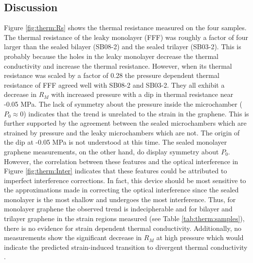 \subsection{Discussion}
Figure \ref{fig:therm:Rs} shows the thermal resistance measured on the four samples.
The thermal resistance of the leaky monolayer (FFF) was roughly a factor of four larger than the sealed bilayer (SB08-2) and the sealed trilayer (SB03-2).
This is probably because the holes in the leaky monolayer decrease the thermal conductivity and increase the thermal resistance.
However, when its thermal resistance was scaled by a factor of 0.28 the pressure dependent thermal resistance of FFF agreed well with SB08-2 and SB03-2.
They all exhibit a decrease in $R_M$ with increased pressure with a dip in thermal resistance near -0.05 MPa.
The lack of symmetry about the pressure inside the microchamber ($P_0 \approx 0$) indicates that the trend is unrelated to the strain in the graphene.
This is further supported by the agreement between the sealed microchambers which are strained by pressure and the leaky microchambers which are not.
The origin of the dip at -0.05 MPa is not understood at this time.
The sealed monolayer graphene measurements, on the other hand, do display symmetry about $P_0$.
However, the correlation between these features and the optical interference in Figure \ref{fig:therm:Inter} indicates that these features could be attributed to imperfect interference corrections.
In fact, this device should be most sensitive to the approximations made in correcting the optical interference since the sealed monolayer is the most shallow and undergoes the most interference.
Thus, for monolayer graphene the observed trend is indecipherable and for bilayer and trilayer graphene in the strain regions measured (see Table \ref{tab:therm:samples}), there is no evidence for strain dependent thermal conductivity.
Additionally, no measurements show the significant decrease in $R_M$ at high pressure which would indicate the predicted strain-induced transition to divergent thermal conductivity \cite{Bonini2012,Pereira2013}.

